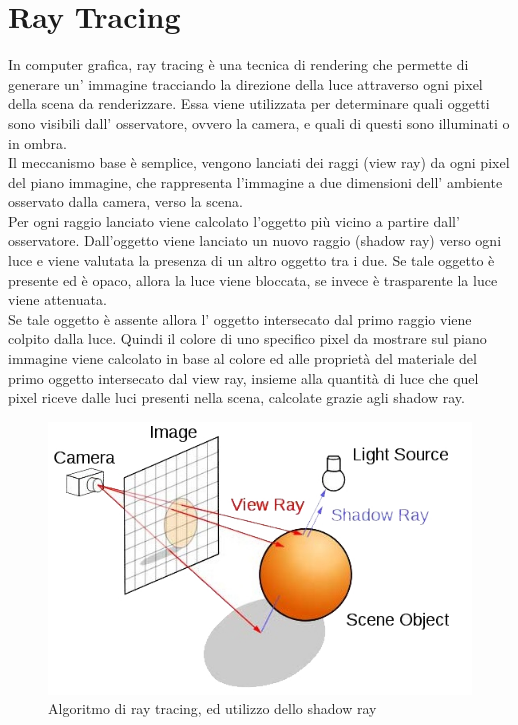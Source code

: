 \section{Ray Tracing}
\label{sec:chapter_stato_arte_ray_tracing}

In computer grafica, ray tracing è una tecnica di rendering che permette di generare un’ immagine tracciando la direzione della luce attraverso ogni pixel della scena da renderizzare.
Essa viene utilizzata per determinare quali oggetti sono visibili dall’ osservatore, ovvero la camera, e quali di questi sono illuminati o in ombra.
\\
Il meccanismo base è semplice, vengono lanciati dei raggi (view ray) da ogni pixel del piano immagine, che rappresenta l’immagine a due dimensioni dell’ ambiente osservato dalla camera, verso la scena.
\\ 
Per ogni raggio lanciato viene calcolato l’oggetto più vicino a partire dall’ osservatore. Dall’oggetto viene lanciato un nuovo raggio (shadow ray) verso ogni luce e viene valutata la presenza di un altro oggetto tra i due.
Se tale oggetto è presente ed è opaco, allora la luce viene bloccata, se invece è trasparente la luce viene attenuata.
\\
Se tale oggetto è assente allora l’ oggetto intersecato dal primo raggio viene colpito dalla luce.
Quindi il colore di uno specifico pixel da mostrare sul piano immagine viene calcolato in base al colore ed alle proprietà del materiale del primo oggetto intersecato dal view ray, insieme alla quantità di luce che quel pixel riceve dalle luci presenti nella scena, calcolate grazie agli shadow ray.
\\
\begin{figure}[htb]
 \centering
 \includegraphics[width=0.7\linewidth]{images/chapter_stato_arte/stato_arte_raytracing_shadowray.jpg}\hfill
 \caption[Ray tracing e shadow ray]{Algoritmo di ray tracing, ed utilizzo dello shadow ray}
 \label{fig:stato_arte_raytracing_shadowray}
\end{figure}
